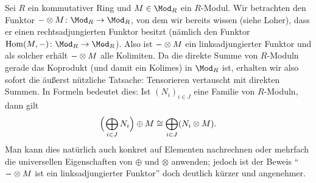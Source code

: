 \begin{thBeispiel}
    \newcommand{\tensorM}{\blank\otimes M}
    Sei $R$ ein kommutativer Ring und $M\in\Mod_R$ ein $R$-Modul. Wir betrachten
    den Funktor $\tensorM\colon\Mod_R\to\Mod_R$, von dem wir bereits
    wissen (siehe Loher\cite[2.8]{talk:loher}), dass er einen rechtsadjungierten
    Funktor besitzt (nämlich den Funktor $\operatorname{Hom}(M,\blank)\colon
    \Mod_R\to\Mod_R$). Also ist $\tensorM$ ein linksadjungierter Funktor und als
    solcher erhält $\tensorM$ alle Kolimiten. Da die direkte Summe von
    $R$-Moduln gerade das Koprodukt (und damit ein Kolimes) in $\Mod_R$ ist,
    erhalten wir also sofort die äußerst nützliche Tatsache:
    Tensorieren vertauscht mit direkten Summen.
    In Formeln bedeutet dies: Ist $(N_i)_{i\in J}$ eine Familie von $R$-Moduln,
    dann gilt
    \[ \Bigl(\mkern2mu \bigoplus_{i\in J} N_i \Bigr)\oplus M
        \cong \bigoplus_{i\in J} (N_i\otimes M)
    . \]
    Man kann dies natürlich auch konkret auf Elementen nachrechnen oder mehrfach
    die universellen Eigenschaften von $\oplus$ und $\otimes$ anwenden; jedoch
    ist der Beweis \enquote{$\tensorM$ ist ein linksadjungierter Funktor} doch
    deutlich kürzer und angenehmer.
\end{thBeispiel}
